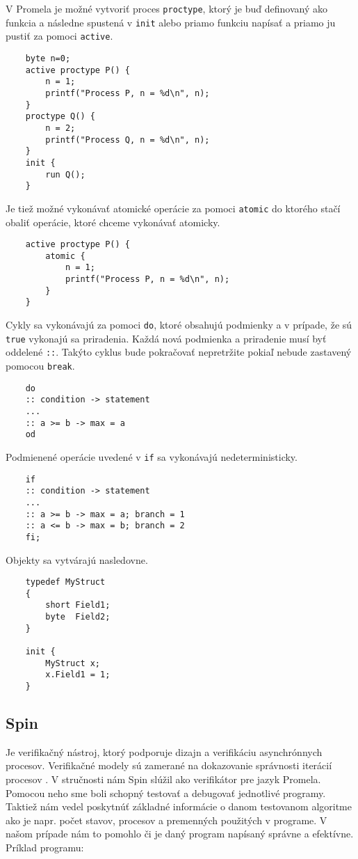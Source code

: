 V Promela je možné vytvoriť proces \texttt{proctype}, ktorý je buď definovaný ako funkcia a 
následne spustená v \texttt{init} alebo priamo funkciu napísať a priamo ju pustiť za pomoci 
\texttt{active}.

\begin{lstlisting}
    byte n=0;
    active proctype P() {
        n = 1;
        printf("Process P, n = %d\n", n);
    }
    proctype Q() {
        n = 2;
        printf("Process Q, n = %d\n", n);
    }
    init {
        run Q();
    }
\end{lstlisting}

Je tiež možné vykonávať atomické operácie za pomoci \texttt{atomic} do ktorého stačí obaliť operácie, 
ktoré chceme vykonávať atomicky.

\begin{lstlisting}
    active proctype P() {
        atomic {
            n = 1;
            printf("Process P, n = %d\n", n);
        }
    }
\end{lstlisting}

Cykly sa vykonávajú za pomoci \texttt{do}, ktoré obsahujú podmienky a v prípade, že sú \texttt{true}
vykonajú sa priradenia. Každá nová podmienka a priradenie musí byť oddelené \texttt{::}. Takýto cyklus
bude pokračovať nepretržite pokiaľ nebude zastavený pomocou \texttt{break}. 

\begin{lstlisting}
    do
    :: condition -> statement
    ...
    :: a >= b -> max = a
    od
\end{lstlisting}

Podmienené operácie uvedené v \texttt{if} sa vykonávajú nedeterministicky. 

\begin{lstlisting}
    if
    :: condition -> statement
    ...
    :: a >= b -> max = a; branch = 1
    :: a <= b -> max = b; branch = 2
    fi;
\end{lstlisting}

Objekty sa vytvárajú nasledovne.

\begin{lstlisting}
    typedef MyStruct
    {
        short Field1;
        byte  Field2;
    }

    init {
        MyStruct x;
        x.Field1 = 1;
    }
\end{lstlisting}

\subsection{Spin}
Je verifikačný nástroj, ktorý podporuje dizajn a verifikáciu asynchrónnych procesov. Verifikačné modely
sú zamerané na dokazovanie správnosti iterácií procesov \cite{br9}. V stručnosti nám Spin slúžil
ako verifikátor pre jazyk Promela. Pomocou neho sme boli schopný testovať a debugovať jednotlivé programy.
Taktiež nám vedel poskytnúť základné informácie o danom testovanom algoritme ako je napr. počet stavov, procesov
a premenných použitých v programe. V našom prípade nám to pomohlo či je daný program napísaný správne a efektívne.
Príklad programu:

